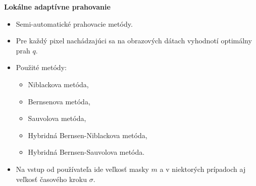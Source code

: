 \documentclass{beamer}
\begin{document}


\begin{frame}{\textbf{Lokálne adaptívne prahovanie}}
\begin{itemize}
	\item Semi-automatické prahovacie metódy.
		\vspace{2mm}

	\item Pre každý pixel nachádzajúci sa na obrazových dátach vyhodnotí optimálny prah $q$.
		\vspace{2mm}
	\item Použité metódy: 
			\begin{itemize}
			\item Niblackova metóda,
			\item Bernsenova metóda,
			\item Sauvolova metóda,
			\item Hybridná Bernsen-Niblackova metóda,
			\item Hybridná Bernsen-Sauvolova metóda.
			\end{itemize}
	\vspace{2mm}
	\item Na vstup od používateľa ide veľkosť masky $m$ a v niektorých prípadoch aj veľkosť časového kroku $\sigma$.
	\end{itemize}
\end{frame}
\end{document}
